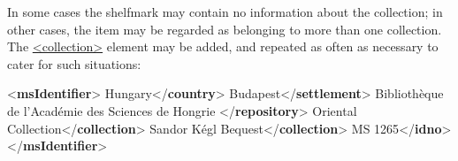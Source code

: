 In some cases the shelfmark may contain no information about the collection; in other cases, the item may be regarded as belonging to more than one collection. The \hyperref[TEI.collection]{<collection>} element may be added, and repeated as often as necessary to cater for such situations: \par\bgroup{}\exampleFont \begin{shaded}\noindent\mbox{}{<\textbf{msIdentifier}>}\mbox{}\newline 
{}Hungary{</\textbf{country}>}\mbox{}\newline 
{}Budapest{</\textbf{settlement}>}\mbox{}\newline 
{} Bibliothèque de l'Académie des Sciences de Hongrie {</\textbf{repository}>}\mbox{}\newline 
{}Oriental Collection{</\textbf{collection}>}\mbox{}\newline 
{}Sandor Kégl Bequest{</\textbf{collection}>}\mbox{}\newline 
{}MS 1265{</\textbf{idno}>}\mbox{}\newline 
{</\textbf{msIdentifier}>}\end{shaded}\egroup\par \par

